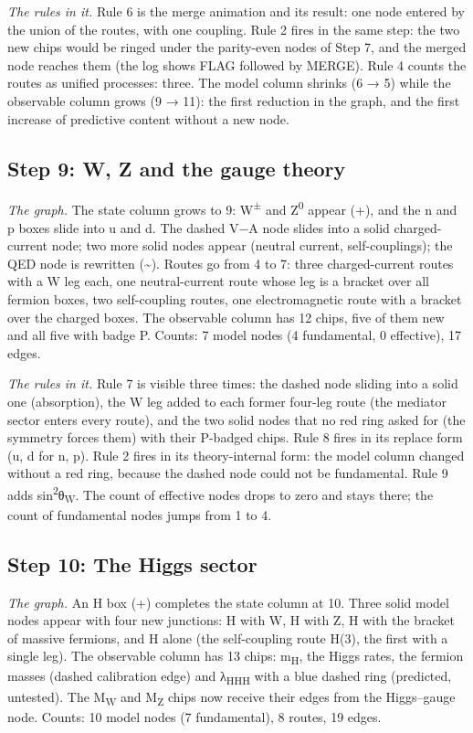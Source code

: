 \noindent\emph{The rules in it.} Rule 6 is the merge animation and its result: one node entered by the union of the routes, with one coupling. Rule 2 fires in the same step: the two new chips would be ringed under the parity-even nodes of Step 7, and the merged node reaches them (the log shows FLAG followed by MERGE). Rule 4 counts the routes as unified processes: three. The model column shrinks (6 → 5) while the observable column grows (9 → 11): the first reduction in the graph, and the first increase of predictive content without a new node.

\subsection*{Step 9: W, Z and the gauge theory}
\noindent\emph{The graph.} The state column grows to 9: W\textsuperscript{±} and Z\textsuperscript{0} appear (+), and the n and p boxes slide into u and d. The dashed V−A node slides into a solid charged-current node; two more solid nodes appear (neutral current, self-couplings); the QED node is rewritten (\textasciitilde{}). Routes go from 4 to 7: three charged-current routes with a W leg each, one neutral-current route whose leg is a bracket over all fermion boxes, two self-coupling routes, one electromagnetic route with a bracket over the charged boxes. The observable column has 12 chips, five of them new and all five with badge P. Counts: 7 model nodes (4 fundamental, 0 effective), 17 edges.

\noindent\emph{The rules in it.} Rule 7 is visible three times: the dashed node sliding into a solid one (absorption), the W leg added to each former four-leg route (the mediator sector enters every route), and the two solid nodes that no red ring asked for (the symmetry forces them) with their P-badged chips. Rule 8 fires in its replace form (u, d for n, p). Rule 2 fires in its theory-internal form: the model column changed without a red ring, because the dashed node could not be fundamental. Rule 9 adds sin\textsuperscript{2}θ\textsubscript{W}. The count of effective nodes drops to zero and stays there; the count of fundamental nodes jumps from 1 to 4.

\subsection*{Step 10: The Higgs sector}
\noindent\emph{The graph.} An H box (+) completes the state column at 10. Three solid model nodes appear with four new junctions: H with W, H with Z, H with the bracket of massive fermions, and H alone (the self-coupling route H(3), the first with a single leg). The observable column has 13 chips: m\textsubscript{H}, the Higgs rates, the fermion masses (dashed calibration edge) and λ\textsubscript{HHH} with a blue dashed ring (predicted, untested). The M\textsubscript{W} and M\textsubscript{Z} chips now receive their edges from the Higgs–gauge node. Counts: 10 model nodes (7 fundamental), 8 routes, 19 edges.

